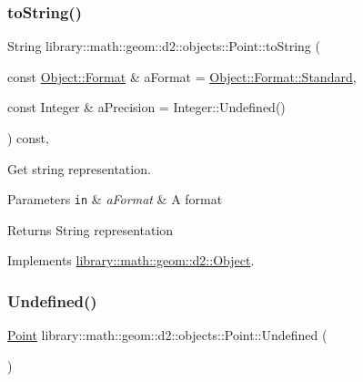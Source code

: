 \subsubsection{\texorpdfstring{to\+String()}{toString()}}
{\footnotesize\ttfamily String library\+::math\+::geom\+::d2\+::objects\+::\+Point\+::to\+String (\begin{DoxyParamCaption}\item[{const \hyperlink{classlibrary_1_1math_1_1geom_1_1d2_1_1_object_ac8cd61dada4960cfee9a469231621b17}{Object\+::\+Format} \&}]{a\+Format = {\ttfamily \hyperlink{classlibrary_1_1math_1_1geom_1_1d2_1_1_object_ac8cd61dada4960cfee9a469231621b17aeb6d8ae6f20283755b339c0dc273988b}{Object\+::\+Format\+::\+Standard}},  }\item[{const Integer \&}]{a\+Precision = {\ttfamily Integer\+:\+:Undefined()} }\end{DoxyParamCaption}) const\hspace{0.3cm}{\ttfamily [override]}, {\ttfamily [virtual]}}



Get string representation. 


\begin{DoxyParams}[1]{Parameters}
\mbox{\tt in}  & {\em a\+Format} & A format \\
\hline
\end{DoxyParams}
\begin{DoxyReturn}{Returns}
String representation 
\end{DoxyReturn}


Implements \hyperlink{classlibrary_1_1math_1_1geom_1_1d2_1_1_object_acdd76b3637732a249536b609dbe3f0eb}{library\+::math\+::geom\+::d2\+::\+Object}.

\mbox{\label{classlibrary_1_1math_1_1geom_1_1d2_1_1objects_1_1_point_a110a5bba9399abc5408f6c34306040c6}} 
\subsubsection{\texorpdfstring{Undefined()}{Undefined()}}
{\footnotesize\ttfamily \hyperlink{classlibrary_1_1math_1_1geom_1_1d2_1_1objects_1_1_point}{Point} library\+::math\+::geom\+::d2\+::objects\+::\+Point\+::\+Undefined (\begin{DoxyParamCaption}{ }\end{DoxyParamCaption})\hspace{0.3cm}{\ttfamily [static]}}



